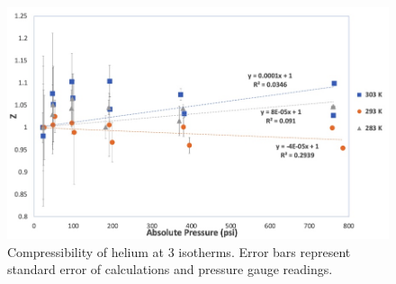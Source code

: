 \documentclass{article}
\begin{document}
\begin{figure}[H] \centering
\includegraphics[width=.8\textwidth]{images/ZvsP Helium.jpg}
\caption{\label{fig1}Compressibility of helium at 3 isotherms. Error bars represent standard error of calculations and pressure gauge readings.}\end{figure}
\end{document}
